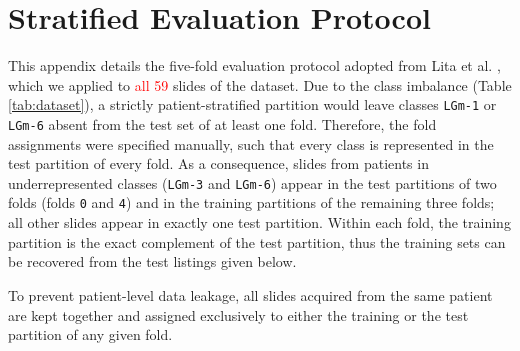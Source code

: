 \newpage


\section{Stratified Evaluation Protocol}
\label{app:cv_schema}
\setcounter{table}{0}
\renewcommand{\thetable}{\Alph{section}.\arabic{table}}

This appendix details the five-fold evaluation protocol adopted from Lita et al. \cite{apollonov2024raman}, which we applied to \textcolor{red}{all 59} slides of the dataset. Due to the class imbalance (Table \ref{tab:dataset}), a strictly patient-stratified partition would leave classes \texttt{LGm-1} or \texttt{LGm-6} absent from the test set of at least one fold. Therefore, the fold assignments were specified manually, such that every class is represented in the test partition of every fold. As a consequence, slides from patients in underrepresented classes (\texttt{LGm-3} and \texttt{LGm-6}) appear in the test partitions of two folds (folds \texttt{0} and \texttt{4}) and in the training partitions of the remaining three folds; all other slides appear in exactly one test partition. Within each fold, the training partition is the exact complement of the test partition, thus the training sets can be recovered from the test listings given below. 

To prevent patient-level data leakage, all slides acquired from the same patient are kept together and assigned exclusively to either the training or the test partition of any given fold.



